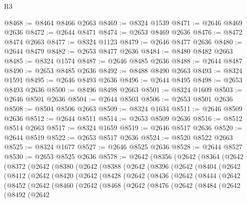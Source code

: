 \begin{lexlean}{R3}
\begin{coremodule}
@8468 := @8464 @8466 @2663
@8469 := @8324 @1539
@8471 := @2646 @8469 @2636
@8472 := @2644 @8471
@8474 := @2653 @8469 @2636
@8476 := @8472 @8474 @2663
@8477 := @8324 @1123
@8479 := @2646 @8477 @2636
@8480 := @2644 @8479
@8482 := @2653 @8477 @2636
@8484 := @8480 @8482 @2663
@8485 := @8324 @1574
@8487 := @2646 @8485 @2636
@8488 := @2644 @8487
@8490 := @2653 @8485 @2636
@8492 := @8488 @8490 @2663
@8493 := @8324 @1591
@8495 := @2646 @8493 @2636
@8496 := @2644 @8495
@8498 := @2653 @8493 @2636
@8500 := @8496 @8498 @2663
@8501 := @8324 @1609
@8503 := @2646 @8501 @2636
@8504 := @2644 @8503
@8506 := @2653 @8501 @2636
@8508 := @8504 @8506 @2663
@8509 := @8324 @1634
@8511 := @2646 @8509 @2636
@8512 := @2644 @8511
@8514 := @2653 @8509 @2636
@8516 := @8512 @8514 @2663
@8517 := @8324 @1659
@8519 := @2646 @8517 @2636
@8520 := @2644 @8519
@8522 := @2653 @8517 @2636
@8524 := @8520 @8522 @2663
@8525 := @8324 @1677
@8527 := @2646 @8525 @2636
@8528 := @2644 @8527
@8530 := @2653 @8525 @2636
@8578 := @2642
    (@8356
      (@2642
        (@8364
          (@2642
            (@8372
              (@2642
                (@8380
                  (@2642
                    (@8388
                      (@2642
                        (@8396
                          (@2642
                            (@8404
                              (@2642
                                (@8412
                                  (@2642
                                    (@8420
                                      (@2642
                                        (@8428
                                          (@2642
                                            (@8436
                                              (@2642
                                                (@8444
                                                  (@2642
                                                    (@8452
                                                      (@2642
                                                        (@8460
                                                          (@2642
                                                            (@8468
                                                              (@2642
                                                                (@8476
                                                                  (@2642
                                                                    (@8484
                                                                      (@2642
                                                                        (@8492
                                                                          (@2642

\end{coremodule}
\end{lexlean}
